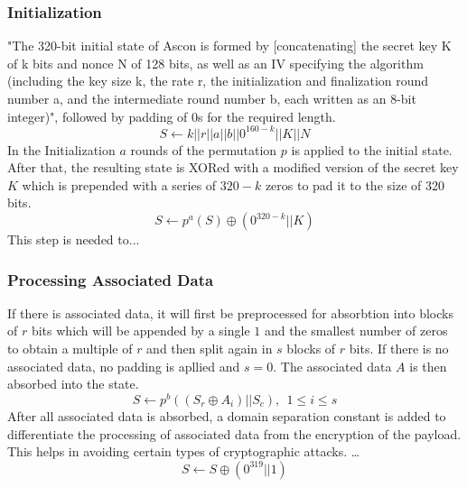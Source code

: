\subsubsection{Initialization}
"The 320-bit initial state of Ascon is formed by [concatenating] the secret key K of k bits and nonce N of 128 bits, as well as an IV specifying the algorithm (including the key size k, the rate r, the initialization and finalization round number a, and the intermediate round number b, each written as an 8-bit integer)", followed by padding of 0s for the required length. 
$$S \leftarrow k || r || a || b || 0^{160-k} || K || N $$
In the Initialization $a$ rounds of the permutation $p$ is applied to the initial state. After that, the resulting state is XORed with a modified version of the secret key $K$ which is prepended with a series of $320-k$ zeros to pad it to the size of 320 bits. \cite{Ascon-v1.2}
$$S \leftarrow p^a(S) \oplus (0^{320-k} || K)$$
This step is needed to... 
\subsubsection{Processing Associated Data}
If there is associated data, it will first be preprocessed for absorbtion into blocks of $r$ bits which will be appended by a single $1$ and the smallest number of zeros to obtain a multiple of $r$ and then split again in $s$ blocks of $r$ bits. If there is no associated data, no padding is apllied and $s=0$.
The associated data $A$ is then absorbed into the state.
$$ S \leftarrow p^b((S_r \oplus A_i) || S_c),\ \ 1 \leq i \leq s$$
After all associated data is absorbed, a domain separation constant is added to differentiate the processing of associated data from the encryption of the payload. 
This helps in avoiding certain types of cryptographic attacks. \dots
$$S \leftarrow S \oplus (0^{319} || 1)$$
\cite{Ascon-v1.2}
